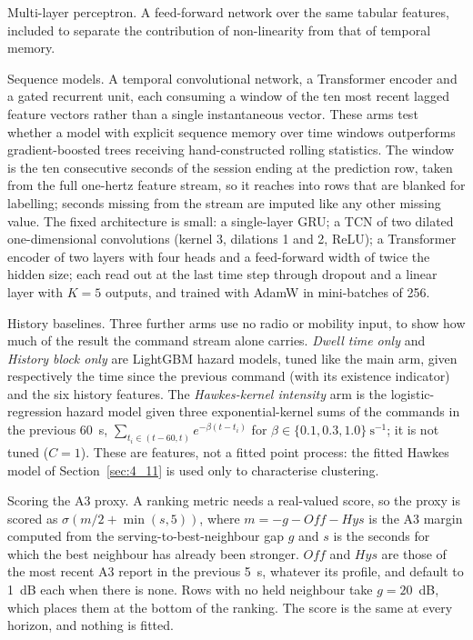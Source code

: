 Multi-layer perceptron. A feed-forward network over the same tabular features, included to separate the contribution of non-linearity from that of temporal memory.

Sequence models. A temporal convolutional network, a Transformer encoder and a gated recurrent unit, each consuming a window of the ten most recent lagged feature vectors rather than a single instantaneous vector. These arms test whether a model with explicit sequence memory over time windows outperforms gradient-boosted trees receiving hand-constructed rolling statistics. The window is the ten consecutive seconds of the session ending at the prediction row, taken from the full one-hertz feature stream, so it reaches into rows that are blanked for labelling; seconds missing from the stream are imputed like any other missing value. The fixed architecture is small: a single-layer GRU; a TCN of two dilated one-dimensional convolutions (kernel 3, dilations 1 and 2, ReLU); a Transformer encoder of two layers with four heads and a feed-forward width of twice the hidden size; each read out at the last time step through dropout and a linear layer with $K = 5$ outputs, and trained with AdamW in mini-batches of 256.

History baselines. Three further arms use no radio or mobility input, to show how much of the result the command stream alone carries. \emph{Dwell time only} and \emph{History block only} are LightGBM hazard models, tuned like the main arm, given respectively the time since the previous command (with its existence indicator) and the six history features. The \emph{Hawkes-kernel intensity} arm is the logistic-regression hazard model given three exponential-kernel sums of the commands in the previous 60~s, $\sum_{t_i \in (t-60, t)} e^{-\beta (t - t_i)}$ for $\beta \in \{0.1, 0.3, 1.0\}~\text{s}^{-1}$; it is not tuned ($C = 1$). These are features, not a fitted point process: the fitted Hawkes model of Section~\ref{sec:4_11} is used only to characterise clustering.

Scoring the A3 proxy. A ranking metric needs a real-valued score, so the proxy is scored as $\sigma(m/2 + \min(s, 5))$, where $m = -g - \mathit{Off} - \mathit{Hys}$ is the A3 margin computed from the serving-to-best-neighbour gap $g$ and $s$ is the seconds for which the best neighbour has already been stronger. $\mathit{Off}$ and $\mathit{Hys}$ are those of the most recent A3 report in the previous 5~s, whatever its profile, and default to 1~dB each when there is none. Rows with no held neighbour take $g = 20$~dB, which places them at the bottom of the ranking. The score is the same at every horizon, and nothing is fitted.

